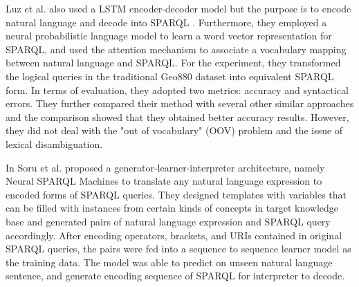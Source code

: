 Luz et al. also used a LSTM encoder-decoder model but the purpose is to encode natural language and decode into SPARQL \cite{Luz2018}. Furthermore, they employed a neural probabilistic language model to learn a word vector representation for SPARQL, and used the attention mechanism to associate a vocabulary mapping between natural language and SPARQL. For the experiment, they transformed the logical queries in the traditional Geo880 dataset into equivalent SPARQL form. In terms of evaluation, they adopted two metrics: accuracy and syntactical errors. They further compared their method with several other similar approaches \cite{alagha2015using} \cite{Kaufmann06querix:a} and the comparison showed that they obtained better accuracy results. However, they did not deal with the "out of vocabulary" (OOV) problem and the issue of lexical disambiguation.

In \cite{Soru2018a,Soru2018} Soru et al. proposed a generator-learner-interpreter architecture, namely Neural SPARQL Machines to translate any natural language expression to encoded forms of SPARQL queries. They designed templates with variables that can be filled with instances from certain kinds of concepts in target knowledge base and generated pairs of natural language expression and SPARQL query accordingly. After encoding operators, brackets, and URIs contained in original SPARQL queries, the pairs were fed into a sequence to sequence learner model as the training data. The model was able to predict on unseen natural language sentence, and generate encoding sequence of SPARQL for interpreter to decode. 